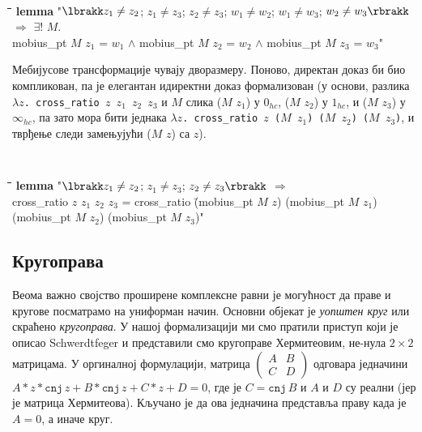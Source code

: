 {\tt
\begin{tabbing}
\hspace{3mm}\=\hspace{5mm}\=\hspace{5mm}\=\hspace{5mm}\=\hspace{5mm}\=\kill
{\bf lemma} "$\lbrakk z_1 \neq z_2$; $z_1 \neq z_3$; $z_2 \neq z_3$; $w_1 \neq w_2$; $w_1 \neq w_3$; $w_2 \neq w_3 \rbrakk$ $\Longrightarrow$ $\exists$! $M$.\\ 
\>mobius\_pt $M$ $z_1$ = $w_1$ $\wedge$ mobius\_pt $M$ $z_2$ = $w_2$ $\wedge$ mobius\_pt $M$ $z_3$ = $w_3$"
\end{tabbing}
}

Мебијусове трансформације чувају дворазмеру. Поново, директан доказ би
био компликован, па је елегантан идиректни доказ формализован (у
основи, разлика {\tt $\lambda z$. cross\_ratio $z$ $z_1$ $z_2$ $z_3$}
и $M$ слика ($M$ $z_1$) у $0_{hc}$, ($M$ $z_2$) у $1_{hc}$, и ($M$
$z_3$) у $\infty_{hc}$, па зато мора бити једнака {\tt $\lambda
  z$. cross\_ratio $z$ ($M$ $z_1$) ($M$ $z_2$) ($M$ $z_3$)}, и тврђење
следи замењујући ($M$ $z$) са $z$).

{\tt
\begin{tabbing}
\hspace{3mm}\=\hspace{5mm}\=\hspace{5mm}\=\hspace{5mm}\=\hspace{5mm}\=\kill
{\bf lemma} "$\lbrakk z_1 \neq z_2$; $z_1 \neq z_3$; $z_2 \neq z_3 \rbrakk$ $\Longrightarrow$\\
\> cross\_ratio $z$ $z_1$ $z_2$ $z_3$ = cross\_ratio \=(mobius\_pt $M$ $z$) (mobius\_pt $M$ $z_1$)\\
\>\>(mobius\_pt $M$ $z_2$) (mobius\_pt $M$ $z_3$)"
\end{tabbing}
}


\subsection{Кругоправа}
\label{subsec:circlines}
Веома важно својство проширене комплексне равни је могућност да праве
и кругове посматрамо на униформан начин. Основни објекат је
\emph{уопштен круг} или скраћено \emph{кругоправа}. У нашој
формализацији ми смо пратили приступ који је описао Schwerdtfeger
\cite{schwerdtfeger} и представили смо кругоправе Хермитеовим, не-нула
$2\times 2$ матрицама. У оргиналној формулацији, матрица
$\left(\begin{array}{cc}A & B\\C & D\end{array}\right)$ одговара
  једначини $A*z*\mathtt{cnj}\,z + B*\mathtt{cnj}\,z + C*z + D = 0$,
  где је $C = \mathtt{cnj}\,B$ и $A$ и $D$ су реални (јер је матрица
  Хермитеова).  Кључано је да ова једначина представља праву када је
  $A=0$, а иначе круг.

